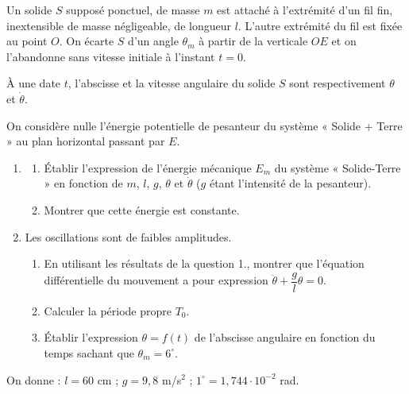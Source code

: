 \documentclass[11pt]{article}
\begin{document}


\begin{minipage}{0.62\linewidth}
Un solide $S$ supposé ponctuel, de masse $m$ est attaché à l'extrémité d'un fil fin, inextensible de masse négligeable, de longueur $l$. L'autre extrémité du fil est fixée au point $O$. On écarte $S$ d'un angle $\theta_m$ à partir de la verticale $OE$ et on l'abandonne sans vitesse initiale à l'instant $t = 0$.

À une date $t$, l'abscisse et la vitesse angulaire du solide $S$ sont respectivement $\theta$ et $\dot{\theta}$.

On considère nulle l'énergie potentielle de pesanteur du système « Solide + Terre » au plan horizontal passant par $E$.
\end{minipage}\hfill
\begin{minipage}{0.34\linewidth}
\centering
{}
\end{minipage}

\begin{enumerate}
  \item \begin{enumerate}[label=\alph*.]
    \item Établir l'expression de l'énergie mécanique $E_m$ du système « Solide-Terre » en fonction de $m$, $l$, $g$, $\theta$ et $\dot{\theta}$ ($g$ étant l'intensité de la pesanteur).
    \item Montrer que cette énergie est constante.
  \end{enumerate}
  \item Les oscillations sont de faibles amplitudes.
  \begin{enumerate}[label=\alph*.]
    \item En utilisant les résultats de la question 1., montrer que l'équation différentielle du mouvement a pour expression $\ddot{\theta} + \dfrac{g}{l}\theta = 0$.
    \item Calculer la période propre $T_0$.
    \item Établir l'expression $\theta = f(t)$ de l'abscisse angulaire en fonction du temps sachant que $\theta_m = 6^\circ$.
  \end{enumerate}
\end{enumerate}
\noindent On donne : $l = 60$ cm ; $g = 9{,}8$ m/s$^2$ ; $1^\circ = 1{,}744\cdot10^{-2}$ rad.
\end{document}
